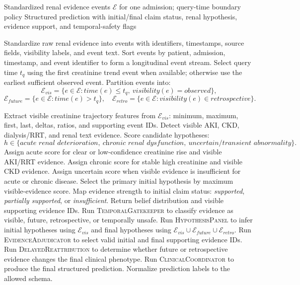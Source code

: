 
\begin{algorithm}[t]
\caption{Temporally Grounded C-BELIEF Reasoning Pipeline}
\label{alg:cbelief_reasoning}
\begin{algorithmic}[1]
\Require Standardized renal evidence events $\mathcal{E}$ for one admission; query-time boundary policy
\Ensure Structured prediction with initial/final claim status, renal hypothesis, evidence support, and temporal-safety flags

\State Standardize raw renal evidence into events with identifiers, timestamps, source fields, visibility labels, and event text.
\State Sort events by patient, admission, timestamp, and event identifier to form a longitudinal event stream.
\State Select query time $t_q$ using the first creatinine trend event when available; otherwise use the earliest sufficient observed event.
\State Partition events into:
\[
\mathcal{E}_{vis}=\{e \in \mathcal{E}: time(e)\le t_q,\ visibility(e)=observed\},
\]
\[
\mathcal{E}_{future}=\{e \in \mathcal{E}: time(e)>t_q\},
\quad
\mathcal{E}_{retro}=\{e \in \mathcal{E}: visibility(e)\in retrospective\}.
\]

    \State Extract visible creatinine trajectory features from $\mathcal{E}_{vis}$: minimum, maximum, first, last, deltas, ratios, and supporting event IDs.
    \State Detect visible AKI, CKD, dialysis/RRT, and renal text evidence.
    \State Score candidate hypotheses:
    \[
    h \in \{\textit{acute renal deterioration},\ \textit{chronic renal dysfunction},\ \textit{uncertain/transient abnormality}\}.
    \]
    \State Assign acute score for clear or low-confidence creatinine rise and visible AKI/RRT evidence.
    \State Assign chronic score for stable high creatinine and visible CKD evidence.
    \State Assign uncertain score when visible evidence is insufficient for acute or chronic disease.
    \State Select the primary initial hypothesis by maximum visible-evidence score.
    \State Map evidence strength to initial claim status: \textit{supported}, \textit{partially supported}, or \textit{insufficient}.
    \State Return belief distribution and visible supporting evidence IDs.
\Else
    \State Run \textsc{TemporalGatekeeper} to classify evidence as visible, future, retrospective, or temporally unsafe.
    \State Run \textsc{HypothesisPanel} to infer initial hypotheses using $\mathcal{E}_{vis}$ and final hypotheses using $\mathcal{E}_{vis}\cup\mathcal{E}_{future}\cup\mathcal{E}_{retro}$.
    \State Run \textsc{EvidenceAdjudicator} to select valid initial and final supporting evidence IDs.
    \State Run \textsc{DelayedReattribution} to determine whether future or retrospective evidence changes the final clinical phenotype.
    \State Run \textsc{ClinicalCoordinator} to produce the final structured prediction.
    \State Normalize prediction labels to the allowed schema.
\EndIf


\end{algorithmic}
\end{algorithm}
